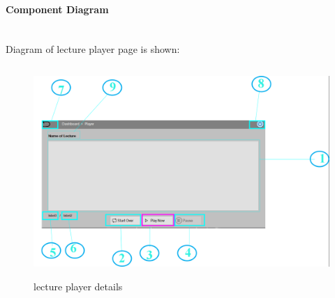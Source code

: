 \documentclass[12pt]{article}
\begin{document}
\paragraph{Component Diagram}\mbox{}\\
Diagram of lecture player page is shown:
\begin{figure}[h]
\begin{center}
\includegraphics[width=12cm, height=8cm]{labeled_player}
\end{center}
\caption{lecture player details}
\end{figure}
\newpage
\end{document}
